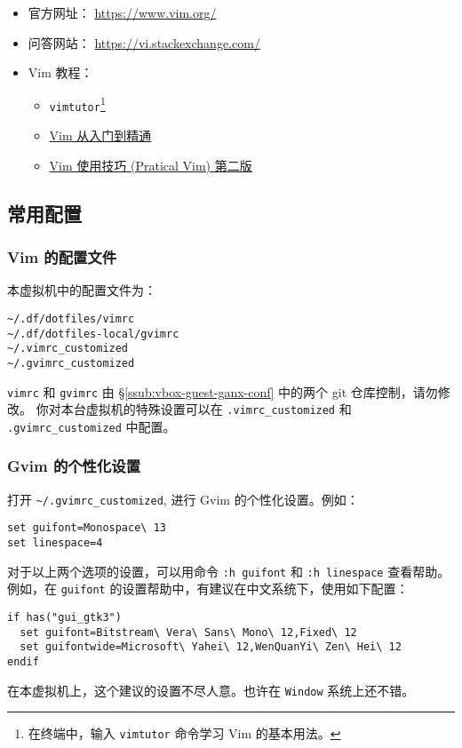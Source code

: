 \documentclass[
    11pt,
    base=hide,
    cite=authoryear,
    device=phone,
    lang=cn,
    mode=simple,
    result=answer,
    toc=onecol,
]{elegantbook_sierxue}
\begin{document}
\begin{itemize}
    \item 官方网址： \href{https://www.vim.org/}{https://www.vim.org/}
    \item 问答网站：
        \href{https://vi.stackexchange.com/}{https://vi.stackexchange.com/}
    \item Vim 教程：
        \begin{itemize}
            \item \lstinline{vimtutor}\footnote{
                在终端中，输入 \lstinline{vimtutor} 命令学习 Vim
                的基本用法。}
            \item \href{https://github.com/wsdjeg/vim-galore-zh_cn}
                {Vim 从入门到精通}
            \item \href{https://item.jd.com/12056490.html}
                {Vim 使用技巧 (Pratical Vim) 第二版}
        \end{itemize}
\end{itemize}

\subsection{常用配置}%
\label{sub:vim-intro}

\subsubsection{Vim 的配置文件}%
\label{ssub:vim-config}

本虚拟机中的配置文件为：
\begin{lstlisting}[escapeinside=``]
~/.df/dotfiles/vimrc
~/.df/dotfiles-local/gvimrc
~/.vimrc_customized
~/.gvimrc_customized
\end{lstlisting}
\lstinline{vimrc} 和 \lstinline{gvimrc} 由
\S\ref{ssub:vbox-guest-ganx-conf} 中的两个 git 仓库控制，请勿修改。
你对本台虚拟机的特殊设置可以在 \lstinline{.vimrc_customized} 和
\lstinline{.gvimrc_customized} 中配置。

\subsubsection{Gvim 的个性化设置}%
\label{ssub:vim-gui-config-customized}

打开 \lstinline{~/.gvimrc_customized}, 进行 Gvim 的个性化设置。例如：
\begin{lstlisting}[escapeinside=``]
set guifont=Monospace\ 13
set linespace=4
\end{lstlisting}
对于以上两个选项的设置，可以用命令 \lstinline{:h guifont} 和
\lstinline{:h linespace} 查看帮助。
例如，在 \lstinline{guifont} 的设置帮助中，有建议在中文系统下，使用如下配置：
\begin{lstlisting}[escapeinside=``]
if has("gui_gtk3")
  set guifont=Bitstream\ Vera\ Sans\ Mono\ 12,Fixed\ 12
  set guifontwide=Microsoft\ Yahei\ 12,WenQuanYi\ Zen\ Hei\ 12
endif
\end{lstlisting}
\begin{note}\label{note:guifont}
    在本虚拟机上，这个建议的设置不尽人意。也许在 \lstinline{Window}
    系统上还不错。
\end{note}
\end{document}
